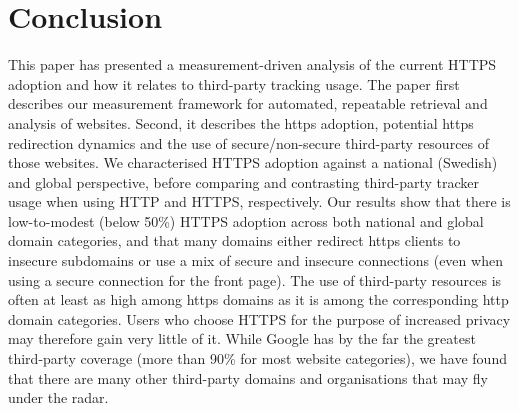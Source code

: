 \documentclass[letterpaper]{sig-alternate-10pt}
\begin{document}



\section{Conclusion}\label{sec:conclusions}

This paper has presented a measurement-driven analysis of the current HTTPS
adoption and how it relates to third-party tracking usage.  The paper first
describes our measurement framework for automated, repeatable retrieval and
analysis of websites. Second, it describes the https adoption, potential
https redirection dynamics and the use of secure/non-secure third-party
resources of those websites. We characterised HTTPS adoption against a
national (Swedish) and global perspective, before comparing and contrasting
third-party tracker usage when using HTTP and HTTPS, respectively.  Our
results show that there is low-to-modest (below 50\%) HTTPS adoption across
both national and global domain categories, and that many domains either
redirect https clients to insecure subdomains or use a mix of secure and
insecure connections (even when using a secure connection for the front
page). The use of third-party resources is often at least as high among
https domains as it is among the corresponding http domain categories.  
Users who choose HTTPS for the purpose of increased privacy may
therefore gain very little of it.  While Google has by the far the greatest
third-party coverage (more than 90\% for most website categories), we have
found that there are many other third-party domains and organisations that
may fly under the radar.
\end{document}
